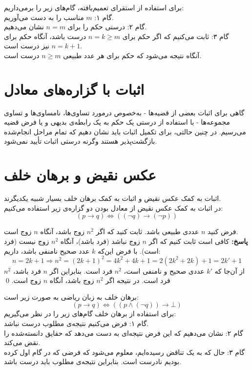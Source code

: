 برای استفاده از استقرای تعمیم‌یافته، گام‌های زیر را برمی‌داریم: \\
گام ۱: $m$ مناسب را به دست می‌آوریم. \\
گام ۲: درستی حکم را برای $n=m$ نشان می‌دهیم. \\
گام ۳: ثابت می‌کنیم که اگر حکم برای
$n=k \geq m$
درست باشد، آنگاه حکم برای
$n=k+1$
نیز درست است. \\
آنگاه نتیجه می‌شود که حکم برای هر عدد طبیعی
$n \geq m$
درست است.

\section{اثبات با گزاره‌های معادل}
گاهی برای اثبات بعضی از قضیه‌ها - به‌خصوص درمورد تساوی‌ها، نامساوی‌ها و تساوی مجموعه‌ها - با استفاده از درستی یک حکم به یک رابطه‌ی بدیهی و یا فرض قضیه می‌رسیم. در چنین حالتی، برای تکمیل اثبات باید نشان دهیم که تمام مراحل انجام‌شده بازگشت‌پذیر هستند وگرنه درستی اثبات تأیید نمی‌شود.

\section{عکس نقیض و برهان خلف}
اثبات به کمک عکس نقیض و اثبات به کمک برهان خلف بسیار شبیه یکدیگرند. \\
در اثبات به کمک عکس نقیض از معادل بودن دو گزاره‌ی زیر استفاده می‌کنیم:
$$(p \rightarrow q) \iff ((\neg q) \rightarrow (\neg p))$$

\begin{example} \label{prexn2even}
	فرض کنید $n$ عددی طبیعی باشد. ثابت کنید که اگر
	$n^2$
	زوج باشد، آنگاه $n$ زوج است. \\
	\textbf{پاسخ:}
	کافی است ثابت کنیم که اگر $n$ زوج نباشد (فرد باشد)، آنگاه
	$n^2$
	زوج نیست (فرد است). با فرض این‌که $k$ عدد صحیح نامنفی باشد، داریم:
	$$n=2k+1 \Rightarrow n^2=(2k+1)^2=4k^2+4k+1=2(2k^2+2k)+1=2k'+1$$
	از آن‌جا که $k'$ عددی صحیح و نامنفی است،
	$n^2$
	فرد است.
	بنابراین اگر $n$ فرد باشد،
	$n^2$
	فرد است. در نتیجه اگر
	$n^2$
	زوج باشد، آنگاه $n$ زوج است.
	\qed
\end{example}
\bigskip
برهان خلف به زبان ریاضی به صورت زیر است:
$$(p \rightarrow q) \iff ((p \wedge (\neg q)) \rightarrow \bot)$$
برای استفاده از برهان خلف گام‌های زیر را در نظر می‌گیریم: \\
گام ۱: فرض می‌کنیم نتیجه‌ی مطلوب درست نباشد. \\
گام ۲: نشان می‌دهیم که این فرض نتیجه‌ای به دست می‌دهد که حقایق دانسته‌شده را نقض می‌کند. \\
گام ۳: حال که به یک تناقض رسیده‌ایم، معلوم می‌شود که فرضی که در گام اول کرده بودیم نادرست است. بنابراین نتیجه‌ی مطلوب باید درست باشد.

